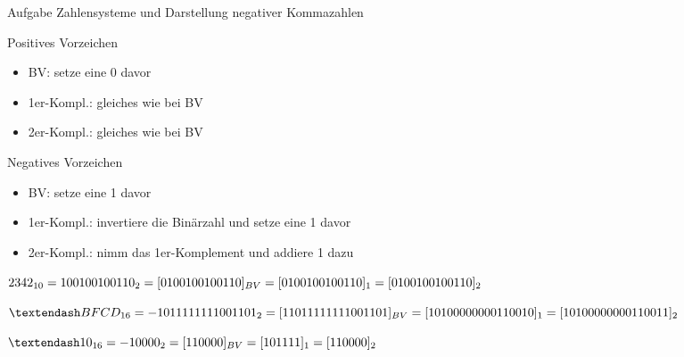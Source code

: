 \begin{frame}[allowframebreaks]{Aufgabe \thesection}{Zahlensysteme und Darstellung negativer Kommazahlen}
{        \begin{block}{Positives Vorzeichen}
            \begin{itemize}
                \item BV: setze eine 0 davor
                \item 1er-Kompl.: gleiches wie bei BV
                \item 2er-Kompl.: gleiches wie bei BV
            \end{itemize}
        \end{block}
        \begin{block}{Negatives Vorzeichen}
            \begin{itemize}
                \item BV: setze eine 1 davor
                \item 1er-Kompl.: invertiere die Binärzahl und setze eine 1 davor
                \item 2er-Kompl.: nimm das 1er-Komplement und addiere 1 dazu
            \end{itemize}
        \end{block}
    }\fi
  \begin{solution}
    $2342_{10} = 100100100110_2 \newline\newline = [0100100100110]_{BV} \newline\newline = [0100100100110]_{1} \newline\newline = [0100100100110]_{2}$
  \end{solution}
  \begin{solution}
    $–BFCD_{16} = - 1011 1111 1100 1101_2 \newline\newline = [11011 1111 1100 1101]_{BV} \newline\newline = [1 0100 0000 0011 0010]_1 \newline\newline = [1 0100 0000 0011 0011]_2$
  \end{solution}
  \begin{solution}
    $–10_{16} = - 1 0000_2 \newline\newline = [11 0000]_{BV} \newline\newline = [10 1111]_1 \newline\newline = [11 0000]_2$  

\end{solution}
\end{frame}
